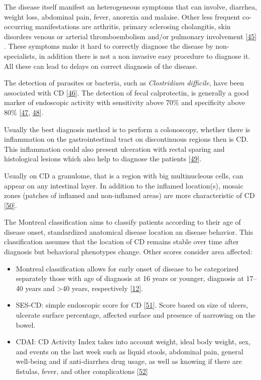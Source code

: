 \documentclass[
  12pt,
  a4paper,
  twoside,
  openright]{book}
\providecommand{\tightlist}{%
  \setlength{\itemsep}{0pt}\setlength{\parskip}{0pt}}
\begin{document}
The disease itself manifest an heterogeneous symptoms that can involve, diarrhea, weight loss, abdominal pain, fever, anorexia and malaise.
Other less frequent co-occurring manifestations are arthritis, primary sclerosing cholangitis, skin disorders venous or arterial thromboembolism and/or pulmonary involvement {[}\protect\hyperlink{ref-baumgart2012}{45}{]} .
These symptoms make it hard to correctly diagnose the disease by non-specialists, in addition there is not a non invasive easy procedure to diagnose it.
All these can lead to delays on correct diagnosis of the disease.

The detection of parasites or bacteria, such as \emph{Clostridium difficile}, have been associated with CD {[}\protect\hyperlink{ref-khanna2017}{46}{]}.
The detection of fecal calprotectin, is generally a good marker of endoscopic activity with sensitivity above 70\% and specificity above 80\% {[}\protect\hyperlink{ref-guardiola2018}{47}, \protect\hyperlink{ref-sands2015}{48}{]}.

Usually the best diagnosis method is to perform a colonoscopy, whether there is inflammation on the gastrointestinal tract on discontinuous regions then is CD.
This inflammation could also present ulceration with rectal sparing and histological lesions which also help to diagnose the patients {[}\protect\hyperlink{ref-corralizamuxe1rquez2019}{49}{]}.

Usually on CD a granulome, that is a region with big multinucleous cells, can appear on any intestinal layer.
In addition to the inflamed location(s), mosaic zones (patches of inflamed and non-inflamed areas) are more characteristic of CD {[}\protect\hyperlink{ref-bassolasmolina2018}{50}{]}.

The Montreal classification aims to classify patients according to their age of disease onset, standardized anatomical disease location an disease behavior.
This classification assumes that the location of CD remains stable over time after diagnosis but behavioral phenotypes change.
Other scores consider area affected:

\begin{itemize}
\tightlist
\item
  Montreal classification allows for early onset of disease to be categorized separately those with age of diagnosis at 16 years or younger, diagnosis at 17--40 years and \textgreater40 years, respectively {[}\protect\hyperlink{ref-satsangi2006}{12}{]}.
\item
  SES-CD: simple endoscopic score for CD {[}\protect\hyperlink{ref-daperno2004}{51}{]}. Score based on size of ulcers, ulcerate surface percentage, affected surface and presence of narrowing on the bowel.
\item
  CDAI: CD Activity Index takes into account weight, ideal body weight, sex, and events on the last week such as liquid stools, abdominal pain, general well-being and if anti-diarrhea drug usage, as well as knowing if there are fistulas, fever, and other complications {[}\protect\hyperlink{ref-best1976}{52}{]}
\end{itemize}
\end{document}
